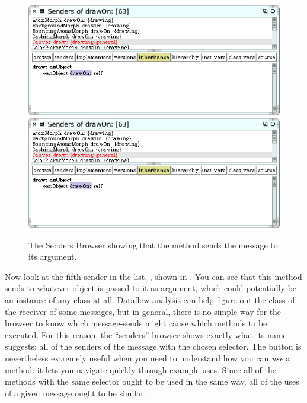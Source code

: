 \documentclass[a4paper,10pt,twoside]{book}
\begin{document}
\begin{figure}[htbp]
	\begin{center}
   \ifluluelse
		{\includegraphics[width=\textwidth]{CanvasDraw}}
		{\includegraphics[scale=0.7]{CanvasDraw}}
	\end{center}
	\caption{The Senders Browser showing that the  method sends the  message to its argument.	\label{fig:CanvasDraw}}
\end{figure}

Now look at the fifth sender in the list, , shown in .
You can see that this method sends  to whatever object is passed to it as argument, which could potentially be an instance of any class at all.  
Dataflow analysis can help figure out the class of the receiver of some messages, but in general, there is no simple way for the browser to know which message-sends might cause which methods to be executed.
For this reason,  the ``senders'' browser shows exactly what its name suggests: all of the senders of the message with the chosen selector.  
The  button is nevertheless extremely useful when you need to understand how you can \emph{use} a method: it lets you navigate quickly through example uses.  
Since all of the methods with the same selector ought to be used in the same way, all of the uses of a given message ought to be similar.
\end{document}
